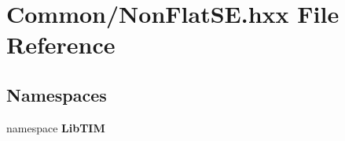 \section{Common/Non\-Flat\-SE.hxx File Reference}
\label{NonFlatSE_8hxx}
\subsection*{Namespaces}
\begin{CompactItemize}
\item 
namespace {\bf Lib\-TIM}
\end{CompactItemize}
